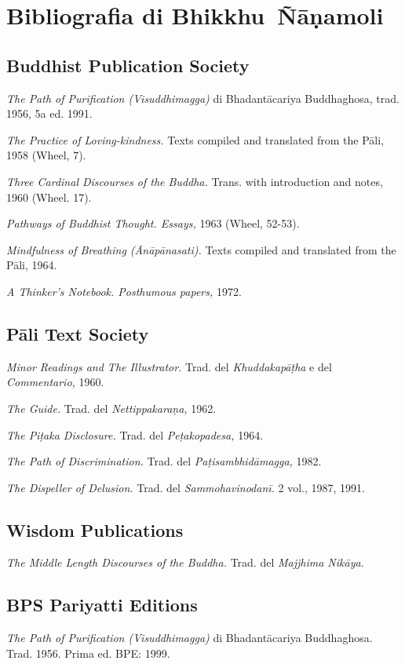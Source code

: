\chapter{Bibliografia di Bhikkhu~Ñāṇamoli}

{\setlength{\parskip}{3pt}

\section{Buddhist Publication Society}

\emph{The Path of Purification (Visuddhimagga)} di Bhadantācariya Buddhaghosa, trad. 1956, 5a ed. 1991.

\emph{The Practice of Loving-kindness.} Texts compiled and translated from the Pāli, 1958 (Wheel, 7).

\emph{Three Cardinal Discourses of the Buddha.} Trans. with introduction and notes, 1960 (Wheel. 17).

\emph{Pathways of Buddhist Thought. Essays,} 1963 (Wheel, 52-53).

\emph{Mindfulness of Breathing (Ānāpānasati).} Texts compiled and translated from the Pāli, 1964.

\emph{A Thinker’s Notebook. Posthumous papers,} 1972.

\vspace*{-10pt}

\section{Pāli Text Society}

\emph{Minor Readings and The Illustrator.} Trad. del \emph{Khuddakapāṭha} e del \emph{Commentario,} 1960.

\emph{The Guide.} Trad. del \emph{Nettippakaraṇa,} 1962.

\emph{The Piṭaka Disclosure.} Trad. del \emph{Peṭakopadesa,} 1964.

\emph{The Path of Discrimination.} Trad. del \emph{Paṭisambhidāmagga,} 1982.

\emph{The Dispeller of Delusion.} Trad. del \emph{Sammohavinodanī.} 2 vol., 1987, 1991.

\vspace*{-10pt}

\section{Wisdom Publications}

\emph{The Middle Length Discourses of the Buddha.} Trad. del \emph{Majjhima Nikāya.}

\vspace*{-10pt}

\section{BPS Pariyatti Editions}

\emph{The Path of Purification (Visuddhimagga)} di Bhadantācariya Buddhaghosa. Trad. 1956. Prima ed. BPE: 1999.

}
